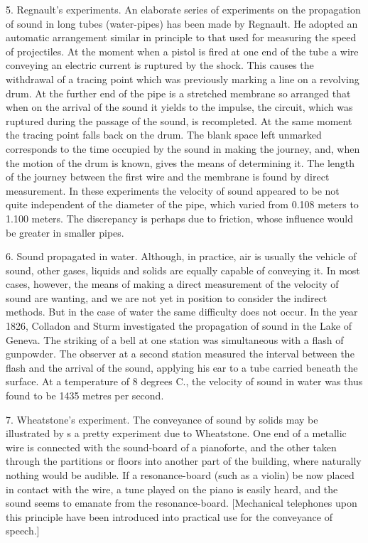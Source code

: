 5.  Regnault’s experiments.  An elaborate series of experiments on the
propagation of sound in long tubes (water-pipes) has been made by Regnault. He
adopted an automatic arrangement similar in principle to that used for
measuring the speed of projectiles. At the moment when a pistol is fired at one
end of the tube a wire conveying an electric current is ruptured by the shock.
This causes the withdrawal of a tracing point which was previously marking a
line on a revolving drum. At the further end of the pipe is a stretched
membrane so arranged that when on the arrival of the sound it yields to the
impulse, the circuit, which was ruptured during the passage of the sound, is
recompleted. At the same moment the tracing point falls back on the drum. The
blank space left unmarked corresponds to the time occupied by the sound in
making the journey, and, when the motion of the drum is known, gives the means
of determining it. The length of the journey between the first wire and the
membrane is found by direct measurement. In these experiments the velocity of
sound appeared to be not quite independent of the diameter of the pipe, which
varied from 0.108 meters to 1.100 meters. The discrepancy is perhaps due to
friction, whose influence would be greater in smaller pipes.

6.  Sound propagated in water.  Although, in practice, air is usually the
vehicle of sound, other gases, liquids and solids are equally capable of
conveying it. In most cases, however, the means of making a direct measurement
of the velocity of sound are wanting, and we are not yet in position to
consider the indirect methods. But in the case of water the same difficulty
does not occur. In the year 1826, Colladon and Sturm investigated the
propagation of sound in the Lake of Geneva. The striking of a bell at one
station was simultaneous with a flash of gunpowder. The observer at a second
station measured the interval between the flash and the arrival of the sound,
applying his ear to a tube carried beneath the surface. At a temperature of 8
degrees C., the velocity of sound in water was thus found to be 1435 metres per
second.

7.  Wheatstone’s experiment.  The conveyance of sound by solids may be
illustrated by s a pretty experiment due to Wheatstone. One end of a metallic
wire is connected with the sound-board of a pianoforte, and the other taken
through the partitions or floors into another part of the building, where
naturally nothing would be audible. If a resonance-board (such as a violin) be
now placed in contact with the wire, a tune played on the piano is easily
heard, and the sound seems to emanate from the resonance-board.  [Mechanical
telephones upon this principle have been introduced into practical use for the
conveyance of speech.]

